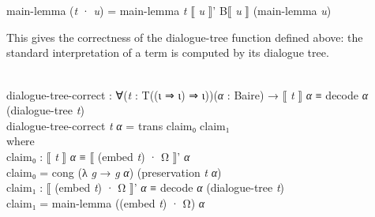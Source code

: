 \documentclass{entcs} \usepackage{prentcsmacro}
\newcommand{\AgdaFontStyle}[1]{\textsf{#1}}
\newcommand{\AgdaBoundFontStyle}[1]{\textit{#1}}
\newcommand{\AgdaKeyword}     [1]
    {\AgdaFontStyle{\textcolor{AgdaKeyword}{#1}}}
\newcommand{\AgdaSymbol}      [1]{\textcolor{AgdaSymbol}{#1}}
\newcommand{\AgdaBound}    [1]{\AgdaBoundFontStyle{\textcolor{AgdaBound}{#1}}}
\newcommand{\AgdaInductiveConstructor}[1]
    {\AgdaFontStyle{\textcolor{AgdaInductiveConstructor}{#1}}}
\newcommand{\AgdaDatatype} [1]{\AgdaFontStyle{\textcolor{AgdaDatatype}{#1}}}
\newcommand{\AgdaFunction} [1]{\AgdaFontStyle{\textcolor{AgdaFunction}{#1}}}
\newcommand{\AgdaIndent}[1]{\quad}
\newcommand{\AgdaCodeStyle}{\small}
\newenvironment{code}%
{\noindent\AgdaCodeStyle\pboxed}%
{\endpboxed\par\noindent%
\ignorespacesafterend}
\begin{document}
\begin{code}
\>[93]\<%
\\
%
\\
\>\AgdaFunction{main-lemma} \AgdaSymbol{(}\AgdaBound{t} \AgdaInductiveConstructor{·} \AgdaBound{u}\AgdaSymbol{)} \AgdaSymbol{=} \AgdaFunction{main-lemma} \AgdaBound{t} \AgdaFunction{⟦} \AgdaBound{u} \AgdaFunction{⟧'} \AgdaFunction{B⟦} \AgdaBound{u} \AgdaFunction{⟧} \AgdaSymbol{(}\AgdaFunction{main-lemma} \AgdaBound{u}\AgdaSymbol{)}\<%
\\
\>\<\end{code}
This gives the correctness of the dialogue-tree function defined
above: the standard interpretation of a term is computed by
its dialogue tree.

\begin{code}\>\<%
\\
\>\AgdaFunction{dialogue-tree-correct} \AgdaSymbol{:} \AgdaSymbol{∀(}\AgdaBound{t} \AgdaSymbol{:} \AgdaDatatype{T}\AgdaSymbol{((}\AgdaInductiveConstructor{ι} \AgdaInductiveConstructor{⇒} \AgdaInductiveConstructor{ι}\AgdaSymbol{)} \AgdaInductiveConstructor{⇒} \AgdaInductiveConstructor{ι}\AgdaSymbol{))(}\AgdaBound{α} \AgdaSymbol{:} \AgdaFunction{Baire}\AgdaSymbol{)} \AgdaSymbol{→} \AgdaFunction{⟦} \AgdaBound{t} \AgdaFunction{⟧} \AgdaBound{α} \AgdaDatatype{≡} \AgdaFunction{decode} \AgdaBound{α} \AgdaSymbol{(}\AgdaFunction{dialogue-tree} \AgdaBound{t}\AgdaSymbol{)}\<%
\\
\>\AgdaFunction{dialogue-tree-correct} \AgdaBound{t} \AgdaBound{α} \AgdaSymbol{=} \AgdaFunction{trans} \AgdaFunction{claim₀} \AgdaFunction{claim₁}\<%
\\
\>[0]\AgdaIndent{2}{}\<[2]%
\>[2]\AgdaKeyword{where}\<%
\\
\>[0]\AgdaIndent{4}{}\<[4]%
\>[4]\AgdaFunction{claim₀} \AgdaSymbol{:} \AgdaFunction{⟦} \AgdaBound{t} \AgdaFunction{⟧} \AgdaBound{α} \AgdaDatatype{≡} \AgdaFunction{⟦} \AgdaSymbol{(}\AgdaFunction{embed} \AgdaBound{t}\AgdaSymbol{)} \AgdaInductiveConstructor{·} \AgdaInductiveConstructor{Ω} \AgdaFunction{⟧'} \AgdaBound{α}\<%
\\
\>[0]\AgdaIndent{4}{}\<[4]%
\>[4]\AgdaFunction{claim₀} \AgdaSymbol{=} \AgdaFunction{cong} \AgdaSymbol{(λ} \AgdaBound{g} \AgdaSymbol{→} \AgdaBound{g} \AgdaBound{α}\AgdaSymbol{)} \AgdaSymbol{(}\AgdaFunction{preservation} \AgdaBound{t} \AgdaBound{α}\AgdaSymbol{)}\<%
\\
\>[0]\AgdaIndent{4}{}\<[4]%
\>[4]\AgdaFunction{claim₁} \AgdaSymbol{:} \AgdaFunction{⟦} \AgdaSymbol{(}\AgdaFunction{embed} \AgdaBound{t}\AgdaSymbol{)} \AgdaInductiveConstructor{·} \AgdaInductiveConstructor{Ω} \AgdaFunction{⟧'} \AgdaBound{α} \AgdaDatatype{≡} \AgdaFunction{decode} \AgdaBound{α} \AgdaSymbol{(}\AgdaFunction{dialogue-tree} \AgdaBound{t}\AgdaSymbol{)}\<%
\\
\>[0]\AgdaIndent{4}{}\<[4]%
\>[4]\AgdaFunction{claim₁} \AgdaSymbol{=} \AgdaFunction{main-lemma} \AgdaSymbol{((}\AgdaFunction{embed} \AgdaBound{t}\AgdaSymbol{)} \AgdaInductiveConstructor{·} \AgdaInductiveConstructor{Ω}\AgdaSymbol{)} \AgdaBound{α}\<%
\\
\>\<\end{code}
\end{document}

